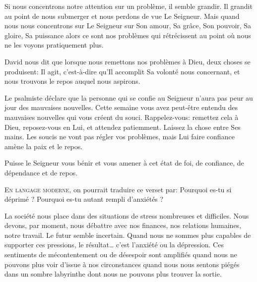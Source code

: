 Si nous concentrons notre attention sur un problème, il semble grandir.
 Il grandit au point de nous submerger et nous perdons de vue Le Seigneur.
 Mais quand nous nous concentrons sur Le Seigneur
 \ocadr sur Son amour, Sa grâce, Son pouvoir, Sa gloire, Sa puissance \fcadr{}
 alors ce sont nos problèmes qui rétrécissent au point
 où nous ne les voyons pratiquement plus. 


David nous dit que lorsque nous remettons nos problèmes à Dieu,
 deux choses se produisent: Il agit, c'est-à-dire qu'Il accomplit
 Sa volonté nous concernant, et nous trouvons le repos auquel nous aspirons.

Le psalmiste déclare que la personne qui se confie au Seigneur
 n'aura pas peur au jour des mauvaises nouvelles.
 Cette semaine vous avez peut-être entendu des mauvaises nouvelles
 qui vous créent du souci. Rappelez-vous: remettez cela à Dieu,
 reposez-vous en Lui, et attendez patiemment.
 Laissez la chose entre Ses mains.
 Les soucis ne vont pas régler vos problèmes,
 mais Lui faire confiance amène la paix et le repos. 

Puisse le Seigneur vous bénir et vous amener à cet état de foi,
 de confiance, de dépendance et de repos. 

\dvrule






\lettrine{E}{n langage moderne,} on pourrait traduire ce verset par:
 \Og Pourquoi es-tu si déprimé ?
 Pourquoi es-tu autant rempli d'anxiétés ? \Fg{}

La société nous place dans des situations de stress nombreuses et difficiles.
 Nous devons, par moment, nous débattre avec nos finances,
 nos relations humaines, notre travail.
 Le futur semble incertain. Quand nous ne sommes plus capables
 de supporter ces pressions, le résultat\dots{}
 c'est l'anxiété ou la dépression.
 Ces sentiments de mécontentement ou de désespoir sont amplifiés
 quand nous ne pouvons plus voir d'issue à nos circonstances
 \ocadr quand nous nous sentons piégés dans un sombre labyrinthe
 dont nous ne pouvons plus trouver la sortie. 

